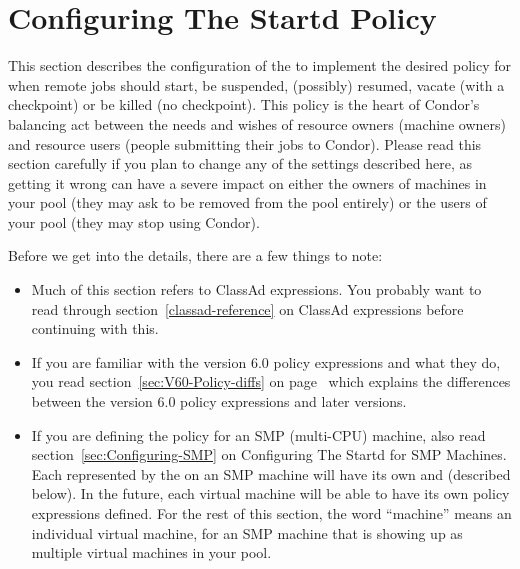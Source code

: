 \section{\label{sec:Configuring-Policy}
Configuring The Startd Policy}

This section describes the configuration of the  to
implement the desired policy for when remote jobs should start, be
suspended, (possibly) resumed, vacate (with a checkpoint) or be killed
(no checkpoint).
This policy is the heart of Condor's balancing act
between the needs and wishes of resource owners (machine owners) and
resource users (people submitting their jobs to Condor).
Please read
this section carefully if you plan to change any of the settings
described here, as getting it wrong can have a severe impact on
either the owners of machines in your pool (they may
ask to be removed from the pool entirely) or the users of your pool
(they may stop using Condor).

Before we get into the details, there are a few things to note:
\begin{itemize}
\item Much of this section refers to ClassAd expressions.  You
probably want to read through section~\ref{classad-reference} on
ClassAd expressions before continuing with this.

\item If you are familiar with the version 6.0 policy expressions and
what they do, you read
section~\ref{sec:V60-Policy-diffs} on
page~\pageref{sec:V60-Policy-diffs} which explains the differences
between the version 6.0 policy expressions and later versions.  

\item If you are defining the policy for an SMP (multi-CPU) machine,
also read section~\ref{sec:Configuring-SMP} on
Configuring The Startd for SMP Machines.  
Each  represented by the  on an
SMP machine will have its own  and 
(described below). 
In the future, each virtual machine will be able to have its
own policy expressions defined.
For the rest of this section, the word ``machine''
means an individual virtual machine, for
an SMP machine that is showing up as multiple virtual
machines in your pool.  
\end{itemize}

